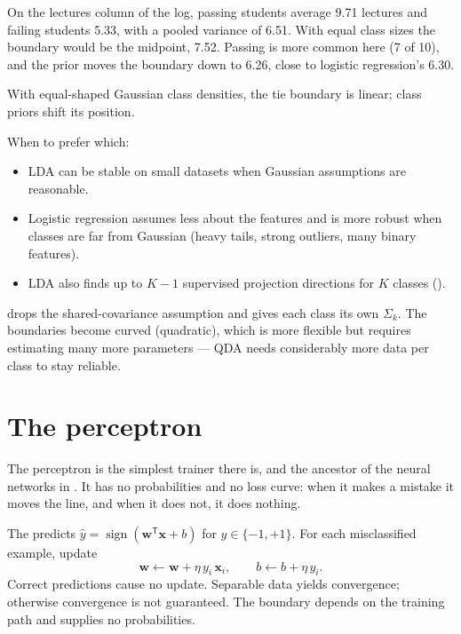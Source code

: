 \begin{workedexample}
On the lectures column of the log, passing students average 9.71 lectures and failing students 5.33, with a pooled variance of 6.51. With equal class sizes the boundary would be the midpoint, 7.52. Passing is more common here (7 of 10), and the prior moves the boundary down to 6.26, close to logistic regression's 6.30.
\end{workedexample}

\begin{intuition}
With equal-shaped Gaussian class densities, the tie boundary is linear; class priors shift its position.
\end{intuition}

When to prefer which:

\begin{itemize}
  \item LDA can be stable on small datasets when Gaussian assumptions are reasonable.
  \item Logistic regression assumes less about the features and is more robust when classes are far from Gaussian (heavy tails, strong outliers, many binary features).
  \item LDA also finds up to $K-1$ supervised projection directions for $K$ classes ().
\end{itemize}

 drops the shared-covariance assumption and gives each class its own $\Sigma_k$. The boundaries become curved (quadratic), which is more flexible but requires estimating many more parameters --- QDA needs considerably more data per class to stay reliable.

\section{The perceptron}

The perceptron is the simplest trainer there is, and the ancestor of the neural networks in . It has no probabilities and no loss curve: when it makes a mistake it moves the line, and when it does not, it does nothing.

The  predicts $\hat y=\operatorname{sign}(\bm w^{\mathsf T}\bm x+b)$ for $y\in\{-1,+1\}$. For each misclassified example, update
\[
  \bm{w}\leftarrow\bm{w}+\eta\,y_i\,\bm{x}_i,
  \qquad
  b\leftarrow b+\eta\,y_i.
\]
Correct predictions cause no update. Separable data yields convergence; otherwise convergence is not guaranteed. The boundary depends on the training path and supplies no probabilities.

